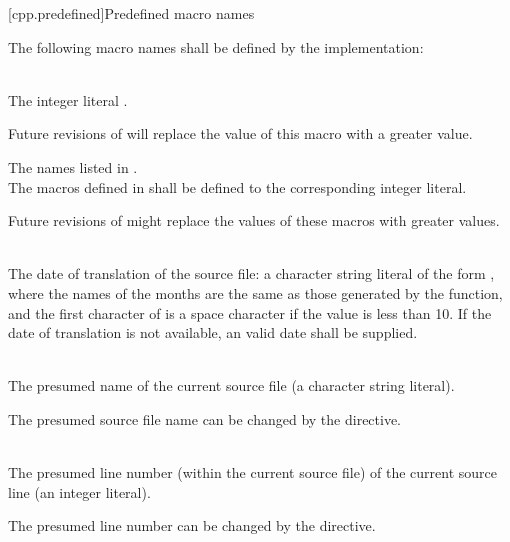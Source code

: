 [cpp.predefined]{Predefined macro names}
%

\pnum
The following macro names shall be defined by the implementation:

\begin{description}

\item
{}%
\\
The integer literal \tcode{\cppver}.
\begin{note}
Future revisions of \Cpp{} will
replace the value of this macro with a greater value.
\end{note}

\item The names listed in .\\
The macros defined in  shall be defined to
the corresponding integer literal.
\begin{note}
Future revisions of \Cpp{} might replace
the values of these macros with greater values.
\end{note}

\item
{}%
\\
The date of translation of the source file:
a character string literal of the form
,
where the names of the months are the same as those generated
by the
function,
and the first character of
is a space character if the value is less than 10.
If the date of translation is not available,
an  valid date
shall be supplied.

\item
{}%
\\
The presumed name of the current source file (a character string
literal).
\begin{footnote}
The presumed source file name can be changed by the  directive.
\end{footnote}

\item
{}%
\\
The presumed line number (within the current source file) of the current source line
(an integer literal).
\begin{footnote}
The presumed line number can be changed by the  directive.
\end{footnote}


\end{description}
